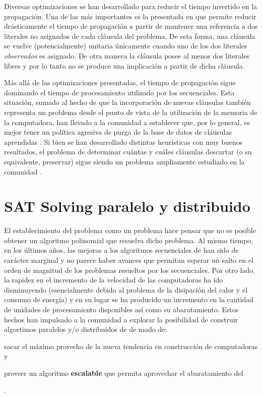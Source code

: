 Diversas optimizaciones se han desarrollado para reducir el tiempo invertido
en la propagación. Una de las más importantes es la presentada en
\cite{moskewicz:da01} que permite reducir drásticamente el tiempo de
propagación a partir de mantener una referencia a dos literales no asignados
de cada cláusula del problema. De esta forma, una cláusula se vuelve
(potencialmente) unitaria únicamente cuando uno de los dos literales
\emph{observados} es asignado. De otra manera la cláusula posee al menos dos
literales libres y por lo tanto no se produce una implicación a partir de
dicha cláusula.

Más allá de las optimizaciones presentadas, el tiempo de propagación sigue
dominando el tiempo de procesamiento utilizado por los \ssolvers secuenciales.
Esta situación, sumado al hecho de que la incorporación de nuevas cláusulas
también representa un problema desde el punto de vista de la utilización de la
memoria de la computadora, han llevado a la comunidad a establecer que, por lo
general, es mejor tener un política agresiva de purga de la base de datos de
cláusulas aprendidas \cite{Audemard:2009:PLC:1661445.1661509}. Si bien se han
desarrollado distintas heurísticas con muy buenos resultados, el problema de
determinar cuántas y cuáles cláusulas descartar (o su equivalente, preservar)
sigue siendo un problema ampliamente estudiado en la comunidad \sat.


\section{SAT Solving paralelo y distribuido}

El establecimiento del problema \sat como un problema \npc hace pensar que no es
posible obtener un algoritmo polinomial que resuelva dicho problema. Al mismo
tiempo, en los últimos años, las mejoras a los algoritmos secuenciales de
\ssolving han sido de carácter marginal y no parece haber avances que permitan
esperar un salto en el orden de magnitud de los problemas resueltos por los
\ssolvers secuenciales. Por otro lado, la rapidez en el incremento de la
velocidad de las computadoras ha ido disminuyendo (esencialmente debido al
problema de la disipación del calor y el consumo de energía)  y en su lugar se ha producido un
incremento en la cantidad de unidades de procesamiento disponibles así como su
abaratamiento. Estos hechos han impulsado a la comunidad \sat a explorar la
posibilidad de construir algortimos paralelos y/o distribuidos de \ssolving de
modo de: \begin{inparaenum}[a)]  \item sacar el máximo provecho de la nueva
tendencia en construcción de computadoras y  \item proveer un algoritmo
\textbf{escalable} que permita aprovechar el abaratamiento del \hard
\end{inparaenum}.

